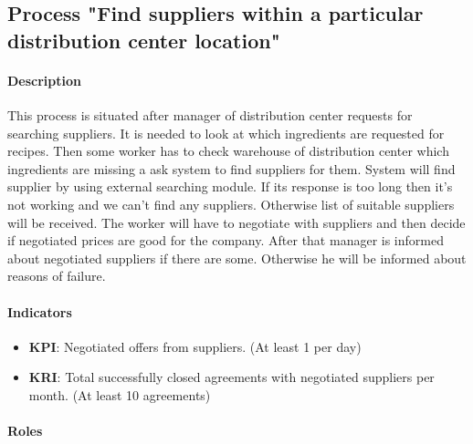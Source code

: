 \documentclass[11pt,a4paper]{article}
\begin{document}



\subsection{Process "Find suppliers within a particular distribution center location"}

\paragraph{Description}

This process is situated after manager of distribution center requests for searching suppliers. It is needed to look at which ingredients are requested for recipes. Then some worker has to check warehouse of distribution center which ingredients are missing a ask system to find suppliers for them. System will find supplier by using external searching module. If its response is too long then it's not working and we can't find any suppliers. Otherwise list of suitable suppliers will be received. The worker will have to negotiate with suppliers and then decide if negotiated prices are good for the company. After that manager is informed about negotiated suppliers if there are some. Otherwise he will be informed about reasons of failure.

\paragraph{Indicators}

\begin{itemize}
    \item \textbf{KPI}: Negotiated offers from suppliers. (At least 1 per day)
    \item \textbf{KRI}: Total successfully closed agreements with negotiated suppliers per month. (At least 10 agreements)
\end{itemize}

\paragraph{Roles}
\end{document}
